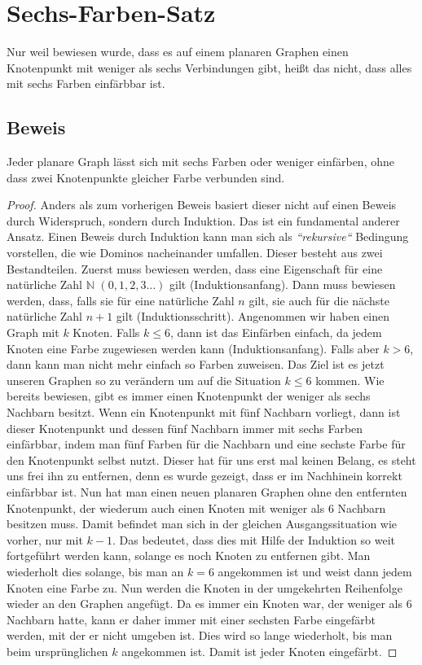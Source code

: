\section{Sechs-Farben-Satz}
Nur weil bewiesen wurde, dass es auf einem planaren Graphen einen Knotenpunkt mit weniger als sechs Verbindungen gibt, heißt das nicht, dass alles mit sechs Farben einfärbbar ist.
\subsection{Beweis}
\begin{theorem}
    Jeder planare Graph lässt sich mit sechs Farben oder weniger einfärben, ohne dass zwei Knotenpunkte gleicher Farbe verbunden sind.
\end{theorem}
\begin{proof}
    Anders als zum vorherigen Beweis basiert dieser nicht auf einen Beweis durch Widerspruch, sondern durch Induktion. Das ist ein fundamental anderer Ansatz. Einen Beweis durch Induktion kann man sich als \textit{``rekursive``} Bedingung vorstellen, die wie Dominos nacheinander umfallen. Dieser besteht aus zwei Bestandteilen. Zuerst muss bewiesen werden, dass eine Eigenschaft für eine natürliche Zahl $\mathbb{N}$ $(0,1,2,3\dots)$ gilt (Induktionsanfang). Dann muss bewiesen werden, dass, falls sie für eine natürliche Zahl $n$ gilt, sie auch für die nächste natürliche Zahl $n+1$ gilt (Induktionsschritt). Angenommen wir haben einen Graph mit $k$ Knoten. Falls $k\leq6$, dann ist das Einfärben einfach, da jedem Knoten eine Farbe zugewiesen werden kann (Induktionsanfang). Falls aber $k>6$, dann kann man nicht mehr einfach so Farben zuweisen. Das Ziel ist es jetzt unseren Graphen so zu verändern um auf die Situation $k\leq6$ kommen. Wie bereits bewiesen, gibt es immer einen Knotenpunkt der weniger als sechs Nachbarn besitzt. Wenn ein Knotenpunkt mit fünf Nachbarn vorliegt, dann ist dieser Knotenpunkt und dessen fünf Nachbarn immer mit sechs Farben einfärbbar, indem man fünf Farben für die Nachbarn und eine sechste Farbe für den Knotenpunkt selbst nutzt. Dieser hat für uns erst mal keinen Belang, es steht uns frei ihn zu entfernen, denn es wurde gezeigt, dass er im Nachhinein korrekt einfärbbar ist. Nun hat man einen neuen planaren Graphen ohne den entfernten Knotenpunkt, der wiederum auch einen Knoten mit weniger als 6 Nachbarn besitzen muss. Damit befindet man sich in der gleichen Ausgangssituation wie vorher, nur mit $k-1$. Das bedeutet, dass dies mit Hilfe der Induktion so weit fortgeführt werden kann, solange es noch Knoten zu entfernen gibt. Man wiederholt dies solange, bis man an $k=6$ angekommen ist und weist dann jedem Knoten eine Farbe zu. Nun werden die Knoten in der umgekehrten Reihenfolge wieder an den Graphen angefügt. Da es immer ein Knoten war, der weniger als 6 Nachbarn hatte, kann er daher immer mit einer sechsten Farbe eingefärbt werden, mit der er nicht umgeben ist. Dies wird so lange wiederholt, bis man beim ursprünglichen $k$ angekommen ist. Damit ist jeder Knoten eingefärbt.
\end{proof}